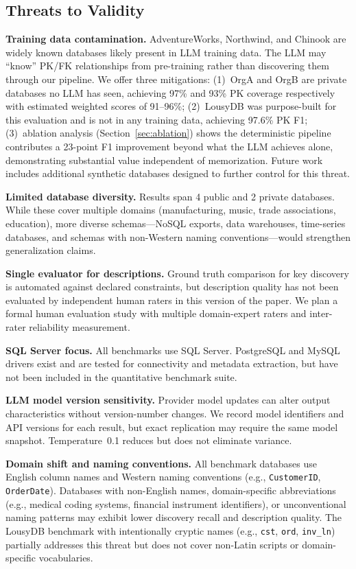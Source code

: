\documentclass[sigconf, nonacm]{acmart}
\begin{document}
\subsection{Threats to Validity}\label{sec:threats}

\textbf{Training data contamination.} AdventureWorks, Northwind, and Chinook are widely known databases likely present in LLM training data. The LLM may ``know'' PK/FK relationships from pre-training rather than discovering them through our pipeline. We offer three mitigations: (1)~OrgA and OrgB are private databases no LLM has seen, achieving 97\% and 93\% PK coverage respectively with estimated weighted scores of 91--96\%; (2)~LousyDB was purpose-built for this evaluation and is not in any training data, achieving 97.6\% PK F1; (3)~ablation analysis (Section~\ref{sec:ablation}) shows the deterministic pipeline contributes a 23-point F1 improvement beyond what the LLM achieves alone, demonstrating substantial value independent of memorization. Future work includes additional synthetic databases designed to further control for this threat.

\textbf{Limited database diversity.} Results span 4 public and 2 private databases. While these cover multiple domains (manufacturing, music, trade associations, education), more diverse schemas---NoSQL exports, data warehouses, time-series databases, and schemas with non-Western naming conventions---would strengthen generalization claims.

\textbf{Single evaluator for descriptions.} Ground truth comparison for key discovery is automated against declared constraints, but description quality has not been evaluated by independent human raters in this version of the paper. We plan a formal human evaluation study with multiple domain-expert raters and inter-rater reliability measurement.

\textbf{SQL Server focus.} All benchmarks use SQL Server. PostgreSQL and MySQL drivers exist and are tested for connectivity and metadata extraction, but have not been included in the quantitative benchmark suite.

\textbf{LLM model version sensitivity.} Provider model updates can alter output characteristics without version-number changes. We record model identifiers and API versions for each result, but exact replication may require the same model snapshot. Temperature~0.1 reduces but does not eliminate variance.

\textbf{Domain shift and naming conventions.} All benchmark databases use English column names and Western naming conventions (e.g., \texttt{CustomerID}, \texttt{OrderDate}). Databases with non-English names, domain-specific abbreviations (e.g., medical coding systems, financial instrument identifiers), or unconventional naming patterns may exhibit lower discovery recall and description quality. The LousyDB benchmark with intentionally cryptic names (e.g., \texttt{cst}, \texttt{ord}, \texttt{inv\_ln}) partially addresses this threat but does not cover non-Latin scripts or domain-specific vocabularies.
\end{document}
